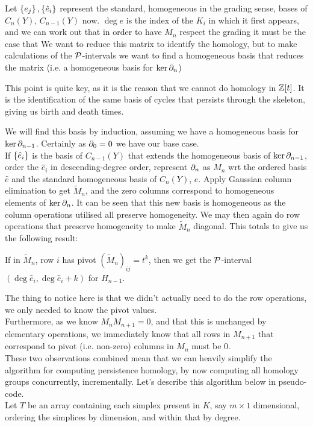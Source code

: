 \documentclass{article}
\begin{document}
Let $\left\{ e_j \right\}, \left\{ \hat{e}_i \right\}$ represent the standard, homogeneous in the grading sense, bases of $C_n(Y), \, C_{n-1}(Y)$ now. $\deg e$ is the index of the $K_i$ in which it first appears, and we can work out that in order to have $M_n$ respect the grading it must be the case that 
We want to reduce this matrix to identify the homology, but to make calculations of the $\mathcal{P}$-intervals we want to find a homogeneous basis that reduces the matrix (i.e. a homogeneous basis for $\ker \partial_n$)
\begin{remark}
	This point is quite key, as it is the reason that we cannot do  homology in $\mathbb{Z}[t]$. It is the identification of the same basis of cycles that persists through the skeleton, giving us birth and death times. 
\end{remark}
We will find this basis by induction, assuming we have a homogeneous basis for $\ker \partial_{n-1}$. Certainly as $\partial_0=0$ we have our base case. \\
If $\left\{ \hat{e}_i \right\}$ is the basis of $C_{n-1}(Y)$ that extends the homogeneous basis of $\ker \partial_{n-1}$, order the $\hat{e}_i$ in descending-degree order, represent $\partial_n$ as $M_n$ wrt the ordered basis $\hat{e}$ and the standard homogeneous basis of $C_n(Y)$, $e$. Apply Gaussian column elimination to get $\tilde{M}_n$, and the zero columns correspond to homogeneous elements of $\ker \partial_{n}$. It can be seen that this new basis is homogeneous as the column operations utilised all preserve homogeneity. We may then again do row operations that preserve homogeneity to make $\tilde{M}_n$ diagonal. This totals to give us the following result:

\begin{prop}
	If in $\tilde{M}_n$, row $i$ has pivot $(\tilde{M}_n)_{ij} = t^k$, then we get the $\mathcal{P}$-interval $(\deg \hat{e}_i, \deg \hat{e}_i + k)$ for $H_{n-1}$. 
\end{prop}

The thing to notice here is that we didn't actually need to do the row operations, we only needed to know the pivot values. \\
Furthermore, as we know $M_nM_{n+1}=0$, and that this is unchanged by elementary operations, we immediately know that all rows in $M_{n+1}$ that correspond to pivot (i.e. non-zero) columns in $M_n$ must be 0. \\
These two observations combined mean that we can heavily simplify the algorithm for computing persistence homology, by now computing all homology groups concurrently, incrementally. Let's describe this algorithm below in pseudo-code. \\
Let $T$ be an array containing each simplex present in $K$, say $m \times 1$ dimensional, ordering the simplices by dimension, and within that by degree.
\end{document}
